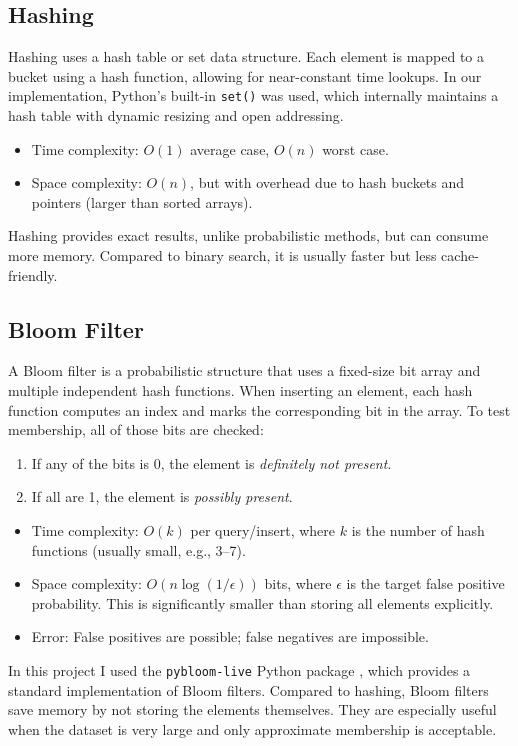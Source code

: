 \documentclass[acmsmall]{acmart}
\begin{document}
\subsection{Hashing}
Hashing uses a hash table or set data structure. Each element is mapped to a bucket using a hash function, allowing for near-constant time lookups. In our implementation, Python’s built-in \texttt{set()} was used, which internally maintains a hash table with dynamic resizing and open addressing.  
\begin{itemize}
  \item Time complexity: $O(1)$ average case, $O(n)$ worst case.  
  \item Space complexity: $O(n)$, but with overhead due to hash buckets and pointers (larger than sorted arrays).  
\end{itemize}
Hashing provides exact results, unlike probabilistic methods, but can consume more memory. Compared to binary search, it is usually faster but less cache-friendly.

\subsection{Bloom Filter}
A Bloom filter is a probabilistic structure that uses a fixed-size bit array and multiple independent hash functions. When inserting an element, each hash function computes an index and marks the corresponding bit in the array. To test membership, 
all of those bits are checked:  
\begin{enumerate}
  \item If any of the bits is 0, the element is \emph{definitely not present}.  
  \item If all are 1, the element is \emph{possibly present}.  
\end{enumerate}

\begin{itemize}
  \item Time complexity: $O(k)$ per query/insert, where $k$ is the number of hash functions (usually small, e.g., 3–7).  
  \item Space complexity: $O(n \log (1/\epsilon))$ bits, where $\epsilon$ is the target false positive probability. This is significantly smaller than storing all elements explicitly.  
  \item Error: False positives are possible; false negatives are impossible.  
\end{itemize}

In this project I used the \texttt{pybloom-live} Python package \cite{pybloom}, which provides a standard implementation of Bloom filters. Compared to hashing, Bloom filters save memory by not storing the elements themselves. They are especially useful when the dataset is very large and only approximate membership is acceptable.
\end{document}
